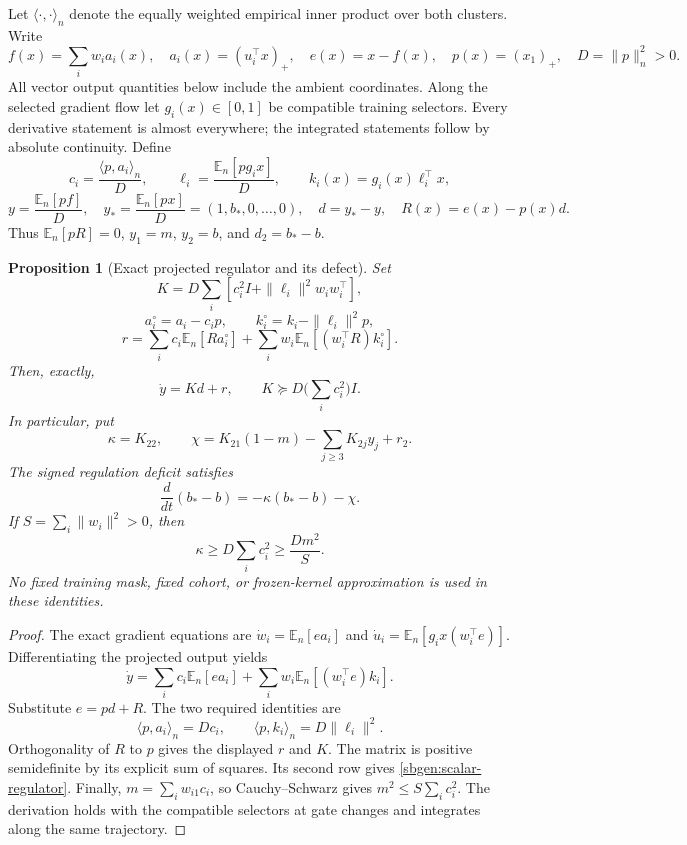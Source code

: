 \documentclass{article} %
\theoremstyle{plain}
\newtheorem{proposition}[theorem]{Proposition}
\theoremstyle{definition}
\theoremstyle{remark}
\begin{document}
Let $\langle\cdot,\cdot\rangle_n$ denote the equally weighted empirical
inner product over both clusters. Write
\[
 f(x)=\sum_i w_i a_i(x),\quad a_i(x)=(u_i^\top x)_+,
 \quad e(x)=x-f(x),\quad p(x)=(x_1)_+,\quad D=\|p\|_n^2>0.
\]
All vector output quantities below include the ambient coordinates.
Along the selected gradient flow let $g_i(x)\in[0,1]$ be compatible
training selectors. Every derivative statement is almost everywhere;
the integrated statements follow by absolute continuity.
Define
\[
 c_i=\frac{\langle p,a_i\rangle_n}{D},\qquad
 \ell_i=\frac{\mathbb E_n[p g_i x]}{D},\qquad
 k_i(x)=g_i(x)\ell_i^\top x,
\]
\[
 y=\frac{\mathbb E_n[p f]}D,\quad
 y_*=\frac{\mathbb E_n[p x]}D=(1,b_*,0,\ldots,0),\quad
 d=y_*-y,\quad R(x)=e(x)-p(x)d.
\]
Thus $\mathbb E_n[pR]=0$, $y_1=m$, $y_2=b$, and $d_2=b_*-b$.

\begin{proposition}[Exact projected regulator and its defect]
\label{sbgen:network-regulator}
Set
\[
 K=D\sum_i\left[c_i^2I+\|\ell_i\|^2w_iw_i^\top\right],
\]
\[
 a_i^\circ=a_i-c_i p,\qquad
 k_i^\circ=k_i-\|\ell_i\|^2p,
\]
\[
 r=\sum_i c_i\mathbb E_n[R a_i^\circ]
       +\sum_i w_i\mathbb E_n[(w_i^\top R)k_i^\circ].
\]
Then, exactly,
\begin{equation}\label{sbgen:vector-regulator}
 \dot y=Kd+r,\qquad K\succeq D\Big(\sum_i c_i^2\Big)I.
\end{equation}
In particular, put
\[
 \kappa=K_{22},\qquad
 \chi=K_{21}(1-m)-\sum_{j\ge3}K_{2j}y_j+r_2.
\]
The signed regulation deficit satisfies
\begin{equation}\label{sbgen:scalar-regulator}
 \frac{d}{dt}(b_*-b)=-\kappa(b_*-b)-\chi.
\end{equation}
If $S=\sum_i\|w_i\|^2>0$, then
\begin{equation}\label{sbgen:clock-lower}
 \kappa\ge D\sum_i c_i^2\ge\frac{Dm^2}{S}.
\end{equation}
No fixed training mask, fixed cohort, or frozen-kernel approximation is
used in these identities.
\end{proposition}
\begin{proof}
The exact gradient equations are
$\dot w_i=\mathbb E_n[e a_i]$ and
$\dot u_i=\mathbb E_n[g_i x(w_i^\top e)]$.
Differentiating the projected output yields
\[
 \dot y=\sum_i c_i\mathbb E_n[e a_i]
             +\sum_i w_i\mathbb E_n[(w_i^\top e)k_i].
\]
Substitute $e=pd+R$. The two required identities are
\[
 \langle p,a_i\rangle_n=Dc_i,\qquad
 \langle p,k_i\rangle_n=D\|\ell_i\|^2.
\]
Orthogonality of $R$ to $p$ gives the displayed $r$ and $K$.
The matrix is positive semidefinite by its explicit sum of squares.
Its second row gives \eqref{sbgen:scalar-regulator}. Finally,
$m=\sum_i w_{i1}c_i$, so Cauchy--Schwarz gives
$m^2\le S\sum_i c_i^2$. The derivation holds with the compatible
selectors at gate changes and integrates along the same trajectory.
\end{proof}
\end{document}

